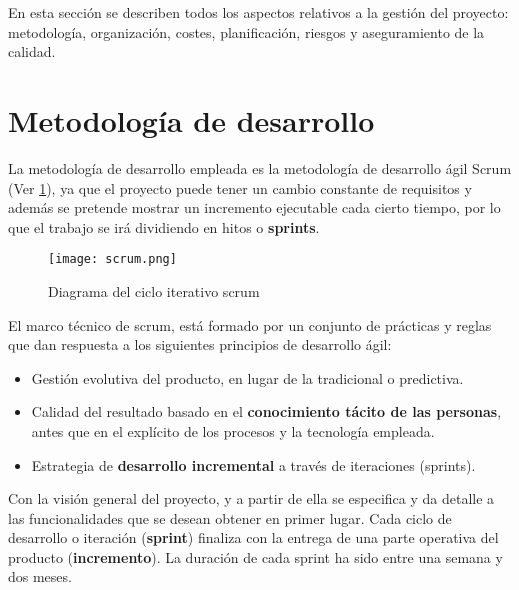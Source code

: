 

En esta sección se describen todos los aspectos relativos a la gestión del proyecto: metodología, organización, costes, planificación, riesgos y aseguramiento de la calidad.

\section{Metodología de desarrollo}
La metodología de desarrollo empleada es la metodología de desarrollo ágil Scrum (Ver \ref{fig:scrum}), ya que el proyecto puede tener un cambio constante de requisitos y además se pretende mostrar un incremento ejecutable cada cierto tiempo, por lo que el trabajo se irá dividiendo en hitos o \textbf{sprints}.\\

\begin{figure}[h!]
  \texttt{[image: scrum.png]}
  \caption{Diagrama del ciclo iterativo scrum}
  \label{fig:scrum}
\end{figure}

El marco técnico de scrum, \cite{scrum2016} está formado por un conjunto de prácticas y reglas que dan respuesta a los siguientes principios de desarrollo ágil:
\begin{itemize}
	\item Gestión evolutiva del producto, en lugar de la tradicional o predictiva.
	\item Calidad del resultado basado en el \textbf{conocimiento tácito de las personas}, antes que en el explícito de los procesos y la tecnología empleada.
	\item Estrategia de \textbf{desarrollo incremental} a través de iteraciones (sprints).
\end{itemize}

Con la visión general del proyecto, y a partir de ella se especifica y da detalle a las funcionalidades que se desean obtener en primer lugar. Cada ciclo de desarrollo o iteración (\textbf{sprint}) finaliza con la entrega de una parte operativa del producto (\textbf{incremento}). La duración de cada sprint ha sido entre una semana y dos meses.\\

